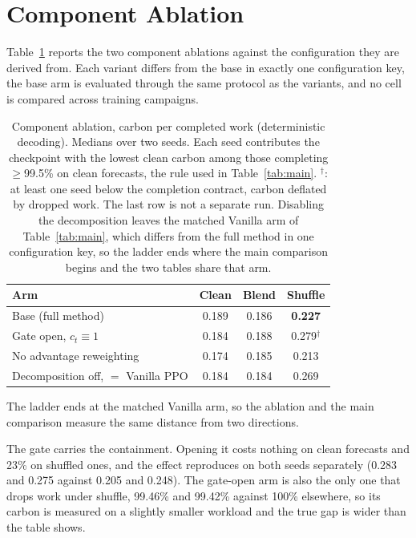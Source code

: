 \documentclass{article} %
\newcommand{\ResVanShuffle}{0.269}    %
\newcommand{\ResVanClean}{0.184}      %
\newcommand{\ResVanBlend}{0.184}      %
\begin{document}
\section{Component Ablation}
\label{app:ablation}

Table~\ref{tab:ablation} reports the two component ablations against the configuration they are derived from. Each variant differs from the base in exactly one configuration key, the base arm is evaluated through the same protocol as the variants, and no cell is compared across training campaigns.

\begin{table}[ht]
\caption{Component ablation, carbon per completed work (deterministic decoding). Medians over two seeds. Each seed contributes the checkpoint with the lowest clean carbon among those completing $\geq$99.5\% on clean forecasts, the rule used in Table~\ref{tab:main}. $^{\dagger}$: at least one seed below the completion contract, carbon deflated by dropped work.
The last row is not a separate run. Disabling the decomposition leaves the matched Vanilla arm of Table~\ref{tab:main}, which differs from the full method in one configuration key, so the ladder ends where the main comparison begins and the two tables share that arm.}
\label{tab:ablation}
\centering
\small
\begin{tabular*}{\linewidth}{@{\extracolsep{\fill}}lccc@{}}
\toprule
Arm & Clean & Blend & Shuffle \\
\midrule
Base (full method)       & 0.189 & 0.186 & \textbf{0.227} \\
Gate open, $c_t\equiv1$  & 0.184 & 0.188 & 0.279$^{\dagger}$ \\
No advantage reweighting & 0.174 & 0.185 & 0.213 \\
\midrule
Decomposition off, $=$ Vanilla PPO & \ResVanClean{} & \ResVanBlend{} & \ResVanShuffle{} \\
\bottomrule
\end{tabular*}
\end{table}

The ladder ends at the matched Vanilla arm, so the ablation and the main comparison measure the same distance from two directions.

The gate carries the containment. Opening it costs nothing on clean forecasts and 23\% on shuffled ones, and the effect reproduces on both seeds separately (0.283 and 0.275 against 0.205 and 0.248). The gate-open arm is also the only one that drops work under shuffle, 99.46\% and 99.42\% against 100\% elsewhere, so its carbon is measured on a slightly smaller workload and the true gap is wider than the table shows.
\end{document}
